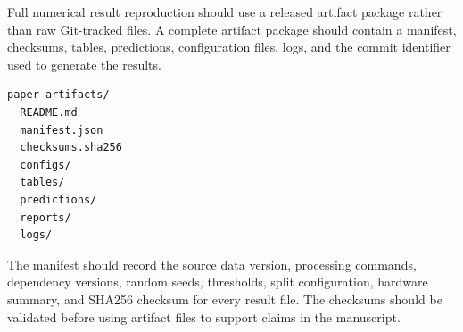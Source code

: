 \documentclass[11pt]{article}
\begin{document}
Full numerical result reproduction should use a released artifact package rather than raw Git-tracked files. A complete artifact package should contain a manifest, checksums, tables, predictions, configuration files, logs, and the commit identifier used to generate the results.

\small
\begin{verbatim}
paper-artifacts/
  README.md
  manifest.json
  checksums.sha256
  configs/
  tables/
  predictions/
  reports/
  logs/
\end{verbatim}
\normalsize

The manifest should record the source data version, processing commands, dependency versions, random seeds, thresholds, split configuration, hardware summary, and SHA256 checksum for every result file. The checksums should be validated before using artifact files to support claims in the manuscript.
\end{document}
